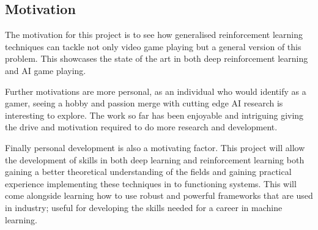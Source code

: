 \documentclass[a4paper]{article}
\begin{document}
\subsection{Motivation}
The motivation for this project is to see how generalised reinforcement learning techniques can tackle not only video game playing but a general version of this problem.
This showcases the state of the art in both deep reinforcement learning and AI game playing.
\par
Further motivations are more personal, as an individual who would identify as a gamer, seeing a hobby and passion merge with cutting edge AI research is interesting to explore.
The work so far has been enjoyable and intriguing giving the drive and motivation required to do more research and development.
\par
Finally personal development is also a motivating factor.
This project will allow the development of skills in both deep learning and reinforcement learning both gaining a better theoretical understanding of the fields and gaining practical experience implementing these techniques in to functioning systems.
This will come alongside learning how to use robust and powerful frameworks that are used in industry; useful for developing the skills needed for a career in machine learning.
\end{document}
